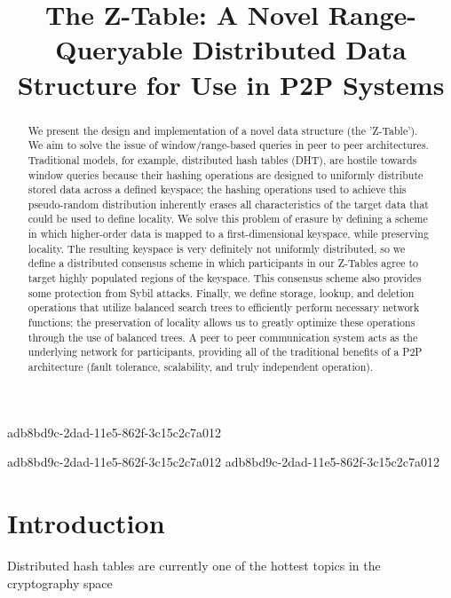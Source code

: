 \documentclass[12pt]{article}
\title{The Z-Table: A Novel Range-Queryable Distributed Data Structure for Use in P2P Systems}
\begin{document}
\maketitle
adb8bd9c-2dad-11e5-862f-3c15c2c7a012
\begin{abstract}
We present the design and implementation of a novel data structure (the 'Z-Table'). We aim to solve the issue of window/range-based queries in peer to peer architectures. Traditional models, for example,  distributed hash tables (DHT), are hostile towards window queries because their hashing operations are designed to uniformly distribute stored data across a defined keyspace; the hashing operations used to achieve this pseudo-random distribution inherently erases all characteristics of the target data that could be used to define locality. We solve this problem of erasure by defining a scheme in which higher-order data is mapped to a first-dimensional keyspace, while preserving locality. The resulting keyspace is very definitely not uniformly distributed, so we define a distributed consensus scheme in which participants in our Z-Tables agree to target highly populated regions of the keyspace. This consensus scheme also provides some protection from Sybil attacks. Finally, we define storage, lookup, and deletion operations that utilize balanced search trees to efficiently perform necessary network functions; the preservation of locality allows us to greatly optimize these operations through the use of balanced trees. A peer to peer communication system acts as the underlying network for participants, providing all of the traditional benefits of a P2P architecture (fault tolerance, scalability, and truly independent operation).
\end{abstract}

adb8bd9c-2dad-11e5-862f-3c15c2c7a012
\newpage
adb8bd9c-2dad-11e5-862f-3c15c2c7a012\section{Introduction}
Distributed hash tables are currently one of the hottest topics in the cryptography space~\cite{Stoica:2001dj,Rowstron:2001ea,Ratnasamy:2001wn}

\printbibliography
\end{document}

